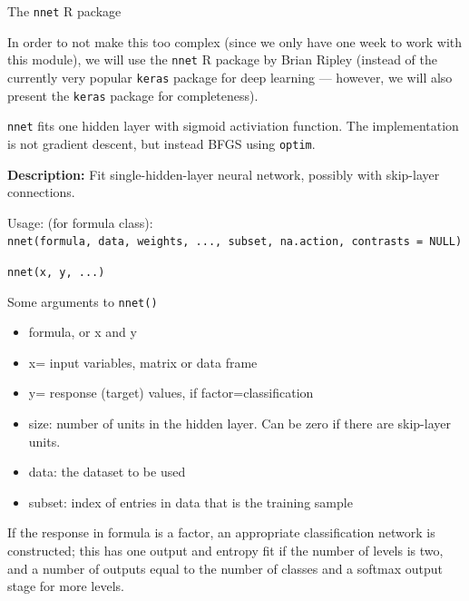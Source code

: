 \documentclass[10pt,ignorenonframetext,]{beamer}
\providecommand{\tightlist}{%
  \setlength{\itemsep}{0pt}\setlength{\parskip}{0pt}}
\begin{document}
\begin{frame}[fragile]

\begin{block}{The \texttt{nnet} R package}

In order to not make this too complex (since we only have one week to
work with this module), we will use the \texttt{nnet} R package by Brian
Ripley (instead of the currently very popular \texttt{keras} package for
deep learning --- however, we will also present the \texttt{keras}
package for completeness).

\texttt{nnet} fits one hidden layer with sigmoid activiation function.
The implementation is not gradient descent, but instead BFGS using
\texttt{optim}.

\textbf{Description:} Fit single-hidden-layer neural network, possibly
with skip-layer connections.

Usage: (for formula class):
\texttt{nnet(formula,\ data,\ weights,\ ...,\ subset,\ na.action,\ contrasts\ =\ NULL)}

\texttt{nnet(x,\ y,\ ...)}

\end{block}

\end{frame}

\begin{frame}[fragile]

Some arguments to \texttt{nnet()}

\begin{itemize}
\tightlist
\item
  formula, or x and y
\item
  x= input variables, matrix or data frame
\item
  y= response (target) values, if factor=classification
\item
  size: number of units in the hidden layer. Can be zero if there are
  skip-layer units.
\item
  data: the dataset to be used
\item
  subset: index of entries in data that is the training sample
\end{itemize}

If the response in formula is a factor, an appropriate classification
network is constructed; this has one output and entropy fit if the
number of levels is two, and a number of outputs equal to the number of
classes and a softmax output stage for more levels.

\end{frame}
\end{document}
